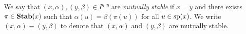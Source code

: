 \documentclass[../main/thesis.tex]{subfiles}
\begin{document}
\begin{definition}

  We say that $(x, \alpha), (y, \beta) \in I^{g, \eta}$ are \emph{mutually
    stable} if $x = y$ and there exists $\pi \in \text{\textbf{Stab}}(x)$ such that $\alpha (u)
  = \beta(\pi (u))$ for all $u \in \text{sp}(x)$. We write $(x, \alpha) \equiv (y,
  \beta)$ to denote that $(x, \alpha)$ and $(y, \beta)$ are mutually stable.
\end{definition}
\end{document}
